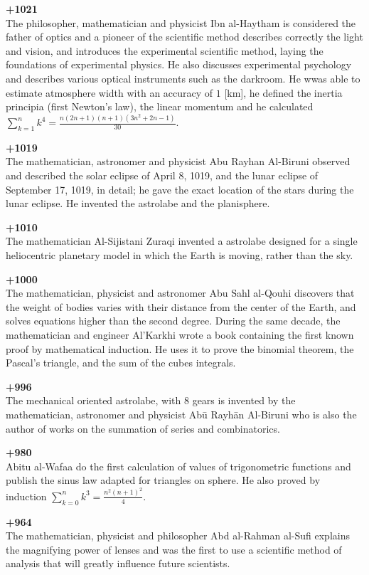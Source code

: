 \textbf{+1021}\\
The philosopher, mathematician and physicist Ibn al-Haytham is considered the father of optics and a pioneer of the scientific method describes correctly the light and vision, and introduces the experimental scientific method, laying the foundations of experimental physics. He also discusses experimental psychology and describes various optical instruments such as the darkroom. He wwas able to estimate atmosphere width with an accuracy of $1$ [km], he defined the inertia principia (first Newton's law), the linear momentum and he calculated $\sum_{k=1}^n k^4=\frac{n(2n+1)(n+1)(3n^2+2n-1)}{30}$.

\textbf{+1019}\\
The mathematician, astronomer and physicist Abu Rayhan Al-Biruni observed and described the solar eclipse of April 8, 1019, and the lunar eclipse of September 17, 1019, in detail; he gave the exact location of the stars during the lunar eclipse. He invented the astrolabe and the planisphere.

\textbf{+1010}\\
The mathematician Al-Sijistani Zuraqi invented a astrolabe designed for a single heliocentric planetary model in which the Earth is moving, rather than the sky.

\textbf{+1000}\\
The mathematician, physicist and astronomer Abu Sahl al-Qouhi discovers that the weight of bodies varies with their distance from the center of the Earth, and solves equations higher than the second degree. During the same decade, the mathematician and engineer Al'Karkhi wrote a book containing the first known proof by mathematical induction. He uses it to prove the binomial theorem, the Pascal's triangle, and the sum of the cubes integrals.

\textbf{+996}\\
The mechanical oriented astrolabe, with 8 gears is invented by the mathematician, astronomer and physicist Abū Rayhān Al-Biruni who is also the author of works on the summation of series and combinatorics.

\textbf{+980}\\
Abitu al-Wafaa do the first calculation of values of trigonometric functions and publish the sinus law adapted for triangles on sphere. He also proved by induction $\sum_{k=0}^n k^3=\frac{n^2(n+1)^2}{4}$.

\textbf{+964}\\
The mathematician, physicist and philosopher Abd al-Rahman al-Sufi explains the magnifying power of lenses and was the first to use a scientific method of analysis that will greatly influence future scientists.

